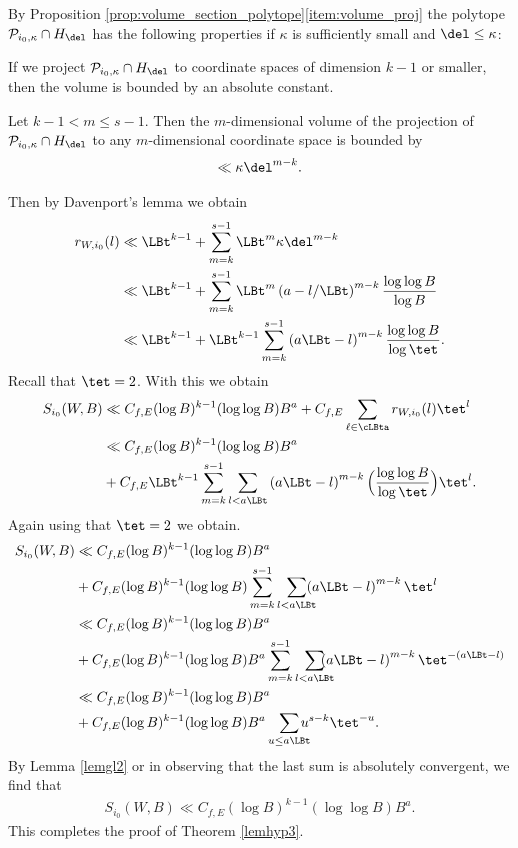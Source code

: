 By Proposition \ref{prop:volume_section_polytope}\eqref{item:volume_proj} the polytope $\mathcal{P}_{i_0,\kappa}\cap H_\del$ has the following properties if $\kappa$ is sufficiently small and $\del\leq \kappa$:
\begin{enumeratei}
\item
If we project $\mathcal{P}_{i_0,\kappa}\cap H_\del$ to coordinate spaces of dimension $k-1$ or smaller, then the volume is bounded by an absolute constant.
\item
Let $k-1< m\leq s-1$. Then the $m$-dimensional volume of the projection of $\mathcal{P}_{i_0,\kappa}\cap H_\del$ to any $m$-dimensional coordinate space is bounded by
\[
\ll \kappa \del^{m-k}.
\]
\end{enumeratei}
Then by Davenport's lemma \cite{davenport} we obtain
\begin{align*}
r_{W,i_0}(l)&\ll \LBt^{k-1} +\sum_{m=k}^{s-1} \LBt^{m} \kappa \del^{m-k} \\
&\ll \LBt^{k-1} + \sum_{m=k}^{s-1} \LBt^{m} \left(a-l/{\LBt}\right)^{m-k} \frac{\log\log B}{\log B}\\
&\ll \LBt^{k-1} +\LBt^{k-1}\sum_{m=k}^{s-1} \left(a\LBt-l\right)^{m-k} \frac{\log\log B}{\log \tet}.
\end{align*}
Recall that $\tet=2$. With this we obtain
\begin{align*}
S_{i_0}(W,B)&\ll C_{f,E} (\log B)^{k-1}(\log \log B) B^a + C_{f,E} \sum_{\ell\in\cLBta} r_{W,i_0}(l) \tet^l\\
&\ll C_{f,E} (\log B)^{k-1}(\log \log B) B^a \\
&+ C_{f,E} \LBt^{k-1}\sum_{m=k}^{s-1} \sum_{l< a\LBt} \left(a\LBt-l\right)^{m-k} \Bigl(\frac{\log\log B}{\log \tet} \Bigr) \tet^l.
\end{align*}
Again using that $\tet=2$ we obtain.
\begin{align*}
S_{i_0}(W,B)&\ll C_{f,E} (\log B)^{k-1}(\log \log B) B^a \\
&+ C_{f,E} (\log B)^{k-1}(\log \log B) \sum_{m=k}^{s-1} \sum_{l< a\LBt}\hspace*{-3mm}\left(a\LBt-l\right)^{m-k} \tet^l \\
&\ll C_{f,E} (\log B)^{k-1}(\log \log B) B^a \\
&+ C_{f,E} (\log B)^{k-1}(\log \log B)B^a \sum_{m=k}^{s-1} \sum_{l< a\LBt}\hspace*{-4mm}\left(a\LBt-l\right)^{m-k} \tet^{-(a \LBt - l)} \\
&\ll C_{f,E} (\log B)^{k-1}(\log \log B) B^a \\
&+C_{f,E} (\log B)^{k-1} (\log \log B) B^a \sum_{u\leq a\LBt}\hspace*{-3mm} u^{s-k} \tet^{-u}.
\end{align*}
By Lemma \ref{lemgl2} or in observing that the last sum is absolutely convergent, we find that
\begin{align*}
S_{i_0}(W,B)\ll C_{f,E} (\log B)^{k-1}(\log \log B) B^a.
\end{align*}
This completes the proof of Theorem \ref{lemhyp3}.
